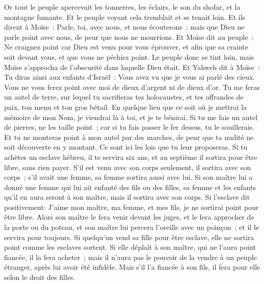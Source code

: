 \begin{multicols}{2}
Or tout le peuple apercevait les tonnerres, les éclairs, le son du shofar, et la montagne fumante. Et le peuple voyant cela tremblait et se tenait loin.
Et ils dirent à Moïse~: Parle, toi, avec nous, et nous écouterons~; mais que Dieu ne parle point avec nous, de peur que nous ne mourrions.
Et Moïse dit au peuple~: Ne craignez point car Dieu est venu pour vous éprouver, et afin que sa crainte soit devant vous, et que vous ne péchiez point.
Le peuple donc se tint loin, mais Moïse s'approcha de l'obscurité dans laquelle Dieu était.
Et Yahweh dit à Moïse~: Tu diras ainsi aux enfants d'Israël~: Vous avez vu que je vous ai parlé des cieux.
Vous ne vous ferez point avec moi de dieux d'argent ni de dieux d'or.
Tu me feras un autel de terre, sur lequel tu sacrifieras tes holocaustes, et tes offrandes de paix, ton menu et ton gros bétail. En quelque lieu que ce soit où je mettrai la mémoire de mon Nom, je viendrai là à toi, et je te bénirai.
Si tu me fais un autel de pierres, ne les taille point~; car si tu fais passer le fer dessus, tu le souillerais.
Et tu ne monteras point à mon autel par des marches, de peur que ta nudité ne soit découverte en y montant.
\VerseOne{}Ce sont ici les lois que tu leur proposeras.
Si tu achètes un esclave hébreu, il te servira six ans, et au septième il sortira pour être libre, sans rien payer.
S'il est venu avec son corps seulement, il sortira avec son corps~; s'il avait une femme, sa femme sortira aussi avec lui.
Si son maître lui a donné une femme qui lui ait enfanté des fils ou des filles, sa femme et les enfants qu'il en aura seront à son maître, mais il sortira avec son corps.
Si l'esclave dit positivement: J'aime mon maître, ma femme, et mes fils, je ne sortirai point pour être libre.
Alors son maître le fera venir devant les juges, et le fera approcher de la porte ou du poteau, et son maître lui percera l'oreille avec un poinçon~; et il le servira pour toujours.
Si quelqu'un vend sa fille pour être esclave, elle ne sortira point comme les esclaves sortent.
Si elle déplaît à son maître, qui ne l'aura point fiancée, il la fera acheter~; mais il n'aura pas le pouvoir de la vendre à un peuple étranger, après lui avoir été infidèle.
Mais s'il l'a fiancée à son fils, il fera pour elle selon le droit des filles.

\end{multicols}
